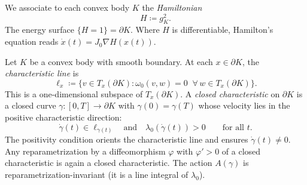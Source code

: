 \begin{definition}[Hamiltonian]\label{def:hamiltonian}
We associate to each convex body $K$ the \emph{Hamiltonian}
\[
  H \coloneqq g_K^2.
\]
The energy surface $\{H = 1\} = \partial K$.
Where $H$ is differentiable, Hamilton's equation reads
$\dot{x}(t) = J_0 \nabla H(x(t))$.
\end{definition}

\begin{definition}\label{def:closed-characteristic}
Let $K$ be a convex body with smooth boundary.
At each $x \in \partial K$, the \emph{characteristic line} is
\[
  \ell_x \coloneqq \{ v \in T_x(\partial K) : \omega_0(v, w) = 0
  \;\;\forall\, w \in T_x(\partial K) \}.
\]
This is a one-dimensional subspace of $T_x(\partial K)$.
A \emph{closed characteristic} on $\partial K$ is a closed curve
$\gamma \colon [0, T] \to \partial K$ with $\gamma(0) = \gamma(T)$
whose velocity lies in the positive characteristic direction:
\[
  \dot{\gamma}(t) \in \ell_{\gamma(t)}
  \quad\text{and}\quad
  \lambda_0(\dot{\gamma}(t)) > 0
  \qquad \text{for all } t.
\]
The positivity condition orients the characteristic line and
ensures $\dot{\gamma}(t) \neq 0$.
Any reparametrization by a diffeomorphism $\varphi$ with $\varphi' > 0$
of a closed characteristic is again a closed characteristic.
The action $A(\gamma)$ is reparametrization-invariant
(it is a line integral of $\lambda_0$).
\end{definition}

